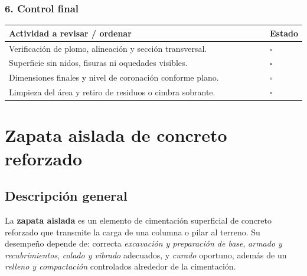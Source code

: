 \documentclass[12pt]{article}
\newcommand{\cbox}{\(\square\)}
\renewcommand{\cbox}{\(\square\)} %
\begin{document}
	\subsubsection*{6. Control final}
	\begin{tabularx}{\linewidth}{>{\raggedright\arraybackslash}p{0.93\linewidth} >{\centering\arraybackslash}m{0.07\linewidth}}
		\toprule
		\textbf{Actividad a revisar / ordenar} & \textbf{Estado}\\
		\midrule
		Verificación de plomo, alineación y sección transversal. & \cbox \\
		Superficie sin nidos, fisuras ni oquedades visibles. & \cbox \\
		Dimensiones finales y nivel de coronación conforme plano. & \cbox \\
		Limpieza del área y retiro de residuos o cimbra sobrante. & \cbox \\
		\bottomrule
	\end{tabularx}
	
	
	
	
	
	\section{Zapata aislada de concreto reforzado}
	
	\subsection*{Descripción general}
	La \textbf{zapata aislada} es un elemento de cimentación superficial de concreto reforzado que transmite la carga de una columna o pilar al terreno. Su desempeño depende de: correcta \emph{excavación y preparación de base}, \emph{armado y recubrimientos}, \emph{colado y vibrado} adecuados, y \emph{curado} oportuno, además de un \emph{relleno y compactación} controlados alrededor de la cimentación.
	
\end{document}
